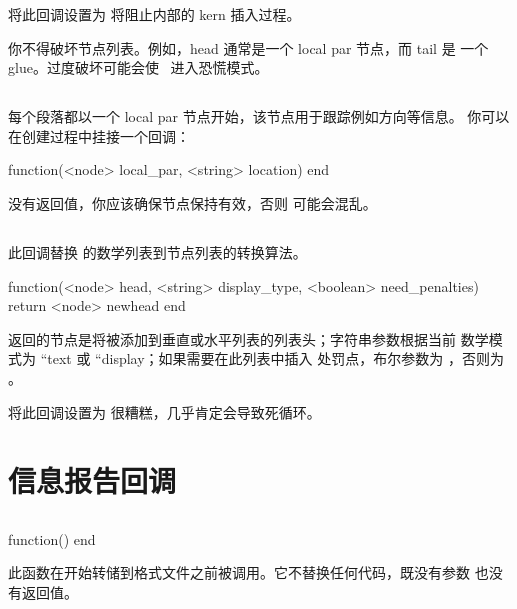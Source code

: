 将此回调设置为  将阻止内部的 kern 插入过程。

你不得破坏节点列表。例如，head 通常是一个 local par 节点，而 tail 是
一个 glue。过度破坏可能会使 \LUATEX\ 进入恐慌模式。

\subsection{}

每个段落都以一个 local par 节点开始，该节点用于跟踪例如方向等信息。
你可以在创建过程中挂接一个回调：

\begin{typing}
function(<node> local_par, <string> location)
end
\end{typing}

没有返回值，你应该确保节点保持有效，否则 \TEX 可能会混乱。

\subsection{}


此回调替换 \LUATEX 的数学列表到节点列表的转换算法。

\begin{typing}
function(<node> head, <string> display_type, <boolean> need_penalties)
    return <node> newhead
end
\end{typing}

返回的节点是将被添加到垂直或水平列表的列表头；字符串参数根据当前
数学模式为 ``text 或 ``display；如果需要在此列表中插入
处罚点，布尔参数为 ，否则为 。

将此回调设置为  很糟糕，几乎肯定会导致死循环。

\section{信息报告回调}

\subsection{}


\begin{typing}
function()
end
\end{typing}

此函数在开始转储到格式文件之前被调用。它不替换任何代码，既没有参数
也没有返回值。

